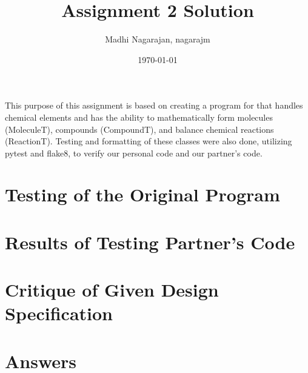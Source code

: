 \documentclass[12pt]{article}
\title{Assignment 2 Solution}
\author{Madhi Nagarajan, nagarajm}
\date{\today}
\begin{document}
\maketitle

This purpose of this assignment is based on creating a program for that handles chemical elements
and has the ability to mathematically form molecules (MoleculeT), compounds (CompoundT), and balance chemical reactions (ReactionT). Testing and formatting of these classes were also done, utilizing pytest and flake8, to verify our personal code and our partner's code.

\section{Testing of the Original Program}


\section{Results of Testing Partner's Code}

\section{Critique of Given Design Specification}

\section{Answers}
\end{document}
